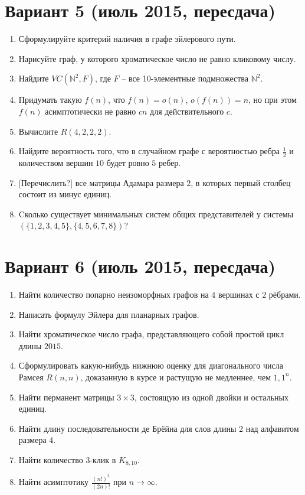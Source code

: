 \documentclass[oneside]{book}
\begin{document}
\section{Вариант 5 (июль 2015, пересдача)}
\begin{enumerate}
\item Сформулируйте критерий наличия в графе эйлерового пути. 
\item Нарисуйте граф, у которого хроматическое число не равно кликовому числу.
\item Найдите $VC(\mathbb{N}^2, F)$, где $F$ -- все 10-элементные подмножества $\mathbb{N}^2$.
\item Придумать такую $f(n)$, что $f(n) = o(n)$, $o(f(n)) = n$, но при этом $f(n)$ асимптотически не равно $cn$ для действительного $c$.
\item Вычислите $R(4, 2, 2, 2)$.
\item Найдите вероятность того, что в случайном графе с вероятностью ребра $\frac{1}{2}$ и количеством вершин $10$ будет ровно $5$ ребер.
\item \hspace{0pt}[Перечислить?] все матрицы Адамара размера $2$, в которых первый столбец состоит из минус единиц.
\item Cколько существует минимальных систем общих представителей у системы $(\{1, 2, 3, 4, 5\}, \{4, 5, 6, 7, 8\})$?
\end{enumerate}

\section{Вариант 6 (июль 2015, пересдача)}
\begin{enumerate}
\item Найти количество попарно неизоморфных графов на $4$ вершинах с $2$ рёбрами.
\item Написать формулу Эйлера для планарных графов.
\item Найти хроматическое число графа, представляющего собой простой цикл длины $2015$.
\item Сформулировать какую-нибудь нижнюю оценку для диагонального числа Рамсея $R(n, n)$, доказанную в курсе и растущую не медленнее, чем $1{,}1^n$.
\item Найти перманент матрицы $3 \times 3$, состоящую из одной двойки и остальных единиц.
\item Найти длину последовательности де Брёйна для слов длины 2 над алфавитом размера 4.
\item Найти количество 3-клик в $K_{8,10}$.
\item Найти асимптотику $\displaystyle \frac{(n!)^2}{(2n)!}$ при $n \rightarrow \infty$.
\end{enumerate}
\end{document}
